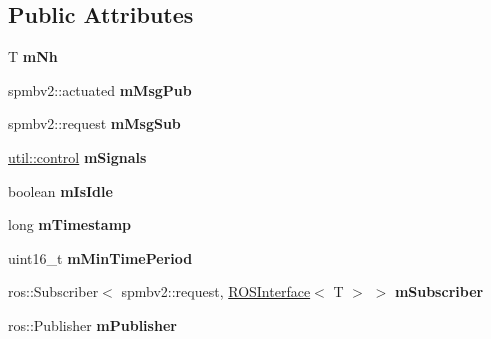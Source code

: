 \subsection*{Public Attributes}
\begin{DoxyCompactItemize}
\item 
T {\bfseries m\+Nh}\hypertarget{classSPMB_1_1ROSInterface_a8a0d97d194910287787071f0bba2f874}{}\label{classSPMB_1_1ROSInterface_a8a0d97d194910287787071f0bba2f874}

\item 
spmbv2\+::actuated {\bfseries m\+Msg\+Pub}\hypertarget{classSPMB_1_1ROSInterface_a808aa2a8f9ddeef7a64271ba48886b8e}{}\label{classSPMB_1_1ROSInterface_a808aa2a8f9ddeef7a64271ba48886b8e}

\item 
spmbv2\+::request {\bfseries m\+Msg\+Sub}\hypertarget{classSPMB_1_1ROSInterface_a1c7beeb4a066a0e3810bc17730f21e44}{}\label{classSPMB_1_1ROSInterface_a1c7beeb4a066a0e3810bc17730f21e44}

\item 
\hyperlink{structSPMB_1_1util_1_1control}{util\+::control} {\bfseries m\+Signals}\hypertarget{classSPMB_1_1ROSInterface_ae6913bbbc7b866f368bed451b782e407}{}\label{classSPMB_1_1ROSInterface_ae6913bbbc7b866f368bed451b782e407}

\item 
boolean {\bfseries m\+Is\+Idle}\hypertarget{classSPMB_1_1ROSInterface_a90fe56a55e9599b2d6c87435c3d9fc23}{}\label{classSPMB_1_1ROSInterface_a90fe56a55e9599b2d6c87435c3d9fc23}

\item 
long {\bfseries m\+Timestamp}\hypertarget{classSPMB_1_1ROSInterface_a66af2aff77df71c0e937ce713117cac4}{}\label{classSPMB_1_1ROSInterface_a66af2aff77df71c0e937ce713117cac4}

\item 
uint16\+\_\+t {\bfseries m\+Min\+Time\+Period}\hypertarget{classSPMB_1_1ROSInterface_a7a7df0454febf2d53aab44d82e3e2e15}{}\label{classSPMB_1_1ROSInterface_a7a7df0454febf2d53aab44d82e3e2e15}

\item 
ros\+::\+Subscriber$<$ spmbv2\+::request, \hyperlink{classSPMB_1_1ROSInterface}{R\+O\+S\+Interface}$<$ T $>$ $>$ {\bfseries m\+Subscriber}\hypertarget{classSPMB_1_1ROSInterface_ab24835b7a571abc2ba3c559d94118bf0}{}\label{classSPMB_1_1ROSInterface_ab24835b7a571abc2ba3c559d94118bf0}

\item 
ros\+::\+Publisher {\bfseries m\+Publisher}\hypertarget{classSPMB_1_1ROSInterface_a26a3aac13b059a5fe61d73beb81ca040}{}\label{classSPMB_1_1ROSInterface_a26a3aac13b059a5fe61d73beb81ca040}

\end{DoxyCompactItemize}



